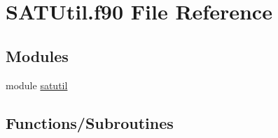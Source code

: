 \hypertarget{SATUtil_8f90}{}\section{S\+A\+T\+Util.\+f90 File Reference}
\label{SATUtil_8f90}
\subsection*{Modules}
\begin{DoxyCompactItemize}
\item 
module \hyperlink{namespacesatutil}{satutil}
\end{DoxyCompactItemize}
\subsection*{Functions/\+Subroutines}
